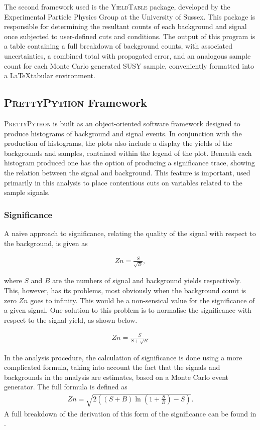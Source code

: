 The second framework used is the Y{\scshape ieldTable} package, developed by the Experimental Particle Physics Group at the University of Sussex.
This package is responsible for determining the resultant counts of each background and signal once subjected to user-defined cuts and conditions.
The output of this program is a table containing a full breakdown of background counts, with associated uncertainties, a combined total with propagated error, and an analogous sample count for each Monte Carlo generated SUSY sample, conveniently formatted into a \LaTeX tabular environment.

\subsection{P{\scshape rettyPython} Framework}
P{\scshape rettyPython} is built as an object-oriented software framework designed to produce histograms of background and signal events. 
In conjunction with the production of histograms, the plots also include a display the yields of the backgrounds and samples, contained within the legend of the plot.
Beneath each histogram produced one has the option of producing a significance trace, showing the relation between the signal and background.
This feature is important, used primarily in this analysis to place contentious cuts on variables related to the sample signals.

\subsubsection{Significance}
A naive approach to significance, relating the quality of the signal with respect to the background, is given as 

\begin{align}
Zn = \frac{S}{\sqrt{B}}, 
\end{align}

\noindent where $S$ and $B$ are the numbers of signal and background yields respectively.
This, however, has its problems, most obviously when the background count is zero $Zn$ goes to infinity.
This would be a non-sensical value for the significance of a given signal.
One solution to this problem is to normalise the significance with respect to the signal yield, as shown below.

\begin{align}
Zn = \frac{S}{S + \sqrt{B}}
\end{align}

\noindent In the analysis procedure, the calculation of significance is done using a more complicated formula, taking into account the fact that the signals and backgrounds in the analysis are estimates, based on a Monte Carlo event generator.
The full formula is defined as \cite{cowan2008discovery}
\begin{align}
Zn = \sqrt{2 \left((S+B)\ln\left(1 + \frac{S}{B} \right) - S\right)}.
\end{align}
\noindent A full breakdown of the derivation of this form of the significance can be found in \cite{cowan2008discovery}.

